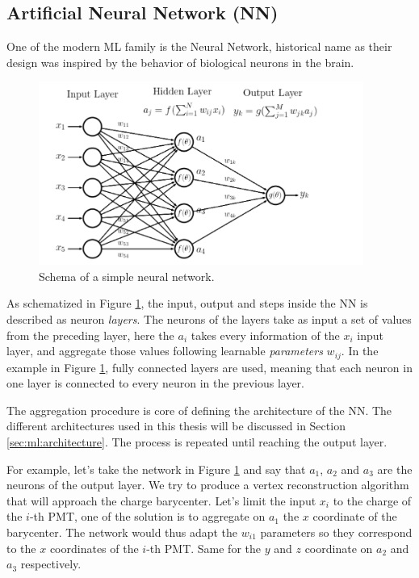 \documentclass[../main.tex]{subfiles}
\begin{document}
\subsection{Artificial Neural Network (NN)}
\label{sec:ml:nn}

One of the modern ML family is the Neural Network, historical name as their design was inspired by the behavior of biological neurons in the brain.
\begin{figure}[ht]
  \centering
  \includegraphics[height=6cm]{images/ml/nn_explications.png}
  \caption{Schema of a simple neural network.}
  \label{fig:ml:schema_nn}
\end{figure}
As schematized in Figure \ref{fig:ml:schema_nn}, the input, output and steps inside the NN is described as neuron \textit{layers}. The neurons of the layers take as input a set of values from the preceding layer, here the $a_i$ takes every information of the $x_i$ input layer, and aggregate those values following learnable \textit{parameters} $w_{ij}$. In the example in Figure \ref{fig:ml:schema_nn}, fully connected layers are used, meaning that each neuron in one layer is connected to every neuron in the previous layer.

The aggregation procedure is core of defining the architecture of the NN. The different architectures used in this thesis will be discussed in Section \ref{sec:ml:architecture}. The process is repeated until reaching the output layer.

For example, let's take the network in Figure \ref{fig:ml:schema_nn} and say that $a_1$, $a_2$ and $a_3$ are the neurons of the output layer. We try to produce a vertex reconstruction algorithm that will approach the charge barycenter. Let's limit the input $x_i$ to the charge of the $i$-th PMT, one of the solution is to aggregate on $a_1$ the $x$ coordinate of the barycenter. The network would thus adapt the $w_{i1}$ parameters so they correspond to the $x$ coordinates of the $i$-th PMT. Same for the $y$ and $z$ coordinate on $a_2$ and $a_3$ respectively.
\end{document}
